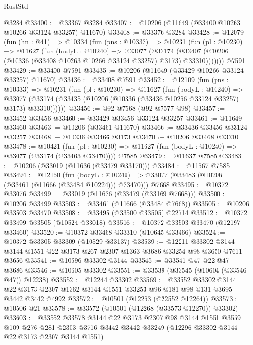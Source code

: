 \begin{lexlean}{RustStd}
\begin{coremodule}
    @3284
@33400 := @33367 @3284
@33407 := @10206 (@11649 (@33400 @10263 @10266 @33124 @33257) @11670)
@33408 := @33376 @3284
@33428 := @12079
    (fun (hn : @41) =>
    @10334
      (fun (pns : @10333) =>
      @10231
        (fun (pl : @10230) =>
        @11627
          (fun (bodyL : @10240) =>
          @33077
            (@33174
              (@33407 (@10206 (@10336 (@33408 @10263 @10266 @33124 @33257) @3173) @33310)))))))
    @7591
@33429 := @33400 @7591
@33435 := @10206 (@11649 (@33429 @10266 @33124 @33257) @11670)
@33436 := @33408 @7591
@33452 := @12109
    (fun (pns : @10333) =>
    @10231
      (fun (pl : @10230) =>
      @11627
        (fun (bodyL : @10240) =>
        @33077 (@33174 (@33435 (@10206 (@10336 (@33436 @10266 @33124 @33257) @3173) @33310))))))
@33456 := @92 @7568 (@92 @7577 @98)
@33457 := @33452 @33456
@33460 := @33429 @33456 @33124 @33257
@33461 := @11649 @33460
@33463 := @10206 (@33461 @11670)
@33466 := @33436 @33456 @33124 @33257
@33468 := @10336 @33466 @3173
@33470 := @10206 @33468 @33310
@33478 := @10421
    (fun (pl : @10230) => @11627 (fun (bodyL : @10240) => @33077 (@33174 (@33463 @33470))))
    @7585
@33479 := @11637 @7585
@33483 := @10206 (@33019 (@11636 (@33479 @33170)))
@33484 := @11667 @7585
@33494 := @12160
    (fun (bodyL : @10240) => @33077 (@33483 (@10206 (@33461 (@11666 (@33484 @10224))) @33470)))
    @7668
@33495 := @10372 @33076
@33499 := @33019 (@11636 (@33479 (@33169 @7668)))
@33500 := @10206 @33499
@33503 := @33461 (@11666 (@33484 @7668))
@33505 := @10206 @33503 @33470
@33508 := @33495 (@33500 @33505) @22714
@33512 := @10372 @33499 @33505 (@10524 @33018)
@33516 := @10372 @33503 @33470 (@12197 @33460)
@33520 := @10372 @33468 @33310 (@10645 @33466)
@33524 := @10372 @33305 @33309 (@10529 @33137)
@33539 := @12211
    @33302
    @3144
    @3144
    @1551
    @22
    @3173
    @267
    @2307
    @1363
    @3686
    @33254
    @98
    @3650
    @7611
    @3656
@33541 := @10596 @33302 @3144
@33545 := @33541 @47 @22 @47 @3686
@33546 := @10605 @33302
@33551 := @33539 (@33545 (@10604 (@33546 @47)) @12238)
@33552 := @12244 @33302
@33569 := @33552
    @33302
    @3144
    @22
    @3173
    @2307
    @1362
    @3144
    @1551
    @33253
    @96
    @181
    @98
    @131
    @3695
    @3442
    @3442
    @4992
@33572 := @10501 (@12263 (@22552 @12264))
@33573 := @10506 @21
@33578 := @33572 (@10501 (@12268 (@33573 @12270)) @33302)
@33603 := @33552
    @33578
    @3144
    @22
    @3173
    @2307
    @98
    @3144
    @1551
    @3559
    @109
    @276
    @281
    @2303
    @3716
    @3442
    @3442
    @33249
    (@12296 @33302 @3144 @22 @3173 @2307 @3144 @1551)

\end{coremodule}
\end{lexlean}
